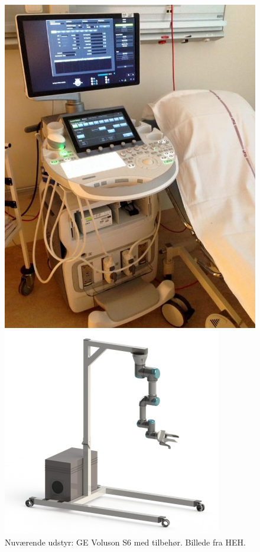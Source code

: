 \begin{figure}[H]
	\begin{minipage}{0.45\textwidth}
		\centering
		\includegraphics[width=\textwidth]{Figurer/udstyrHorsens.jpg}
		\caption{Nuværende udstyr: GE Voluson S6 med tilbehør. Billede fra HEH.}
		\label{udstyrHorsens}
	\end{minipage}
	\hspace{0.02\textwidth}
	\begin{minipage}{0.55\textwidth}
		\centering
		\includegraphics[width=\textwidth]{Figurer/StativMedUR3Render.png}

\end{minipage}
\end{figure}
